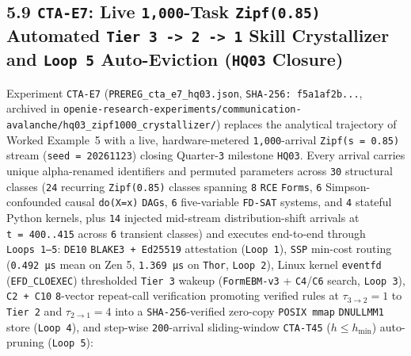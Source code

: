 \documentclass[10pt,letterpaper]{article}
\begin{document}
\subsection{\texorpdfstring{5.9 \texttt{CTA-E7}: Live
\texttt{1,000}-Task \texttt{Zipf(0.85)} Automated
\texttt{Tier\ 3\ -\textgreater{}\ 2\ -\textgreater{}\ 1} Skill
Crystallizer and \texttt{Loop\ 5} Auto-Eviction (\texttt{HQ03}
Closure)}{5.9 CTA-E7: Live 1,000-Task Zipf(0.85) Automated Tier 3 -> 2 -> 1 Skill Crystallizer and Loop 5 Auto-Eviction (HQ03 Closure)}}\label{cta-e7-live-1000-task-zipf085-automated-tier-3---2---1-skill-crystallizer-and-loop-5-auto-eviction-hq03-closure}

Experiment \texttt{CTA-E7}
(\texttt{PREREG\_\allowbreak{}cta\_\allowbreak{}e7\_\allowbreak{}hq03.\allowbreak{}json},
\texttt{SHA-\allowbreak{}256:\ f5a1af2b...}, archived in
\texttt{openie-\allowbreak{}research-\allowbreak{}experiments/\allowbreak{}communication-\allowbreak{}avalanche/\allowbreak{}hq03\_\allowbreak{}zipf1000\_\allowbreak{}crystallizer/})
replaces the analytical trajectory of Worked Example~5 with a live,
hardware-metered \texttt{1,000}-arrival \texttt{Zipf(s\ =\ 0.85)} stream
(\texttt{seed\ =\ 20261123}) closing Quarter-\texttt{3} milestone
\texttt{HQ03}. Every arrival carries unique alpha-renamed identifiers
and permuted parameters across \texttt{30} structural classes
(\texttt{24} recurring \texttt{Zipf(0.85)} classes spanning \texttt{8}
\texttt{RCE} \texttt{Forms}, \texttt{6} Simpson-confounded causal
\texttt{do(X=x)} \texttt{DAGs}, \texttt{6} five-variable \texttt{FD-SAT}
systems, and \texttt{4} stateful Python kernels, plus \texttt{14}
injected mid-stream distribution-shift arrivals at
\texttt{t\ =\ 400..415} across \texttt{6} transient classes) and
executes end-to-end through \texttt{Loops\ 1--5}: \texttt{DE10}
\texttt{BLAKE3\ +\ Ed25519} attestation (\texttt{Loop\ 1}), \texttt{SSP}
min-cost routing (\texttt{0.492\ µs} mean on Zen 5, \texttt{1.369\ µs}
on \texttt{Thor}, \texttt{Loop\ 2}), Linux kernel \texttt{eventfd}
(\texttt{EFD\_\allowbreak{}CLOEXEC}) thresholded \texttt{Tier\ 3} wakeup
(\texttt{FormEBM-\allowbreak{}v3} + \texttt{C4}/\allowbreak{}\texttt{C6} search,
\texttt{Loop\ 3}), \texttt{C2\ +\ C10} \texttt{8}-vector repeat-call
verification promoting verified rules at \(\tau_{3\to 2} = 1\) to
\texttt{Tier\ 2} and \(\tau_{2\to 1} = 4\) into a
\texttt{SHA-256}-verified zero-copy \texttt{POSIX\ mmap}
\texttt{DNULLMM1} store (\texttt{Loop\ 4}), and step-wise
\texttt{200}-arrival sliding-window \texttt{CTA-T45}
(\(h \le h_{\min}\)) auto-pruning (\texttt{Loop\ 5}):
\end{document}
